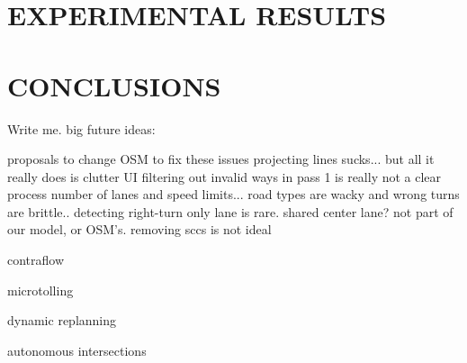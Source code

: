 \documentclass[letterpaper, 10 pt, conference]{ieeeconf}  %
\begin{document}


 


\section{EXPERIMENTAL RESULTS}



\section{CONCLUSIONS}

Write me. big future ideas:

proposals to change OSM to fix these issues
  projecting lines sucks... but all it really does is clutter UI
  filtering out invalid ways in pass 1 is really not a clear process
  number of lanes and speed limits... road types are wacky and wrong
  turns are brittle.. detecting right-turn only lane is rare. shared center lane?
    not part of our model, or OSM's.
  removing sccs is not ideal

contraflow

microtolling

dynamic replanning

autonomous intersections

\addtolength{\textheight}{-12cm}  %
\end{document}
